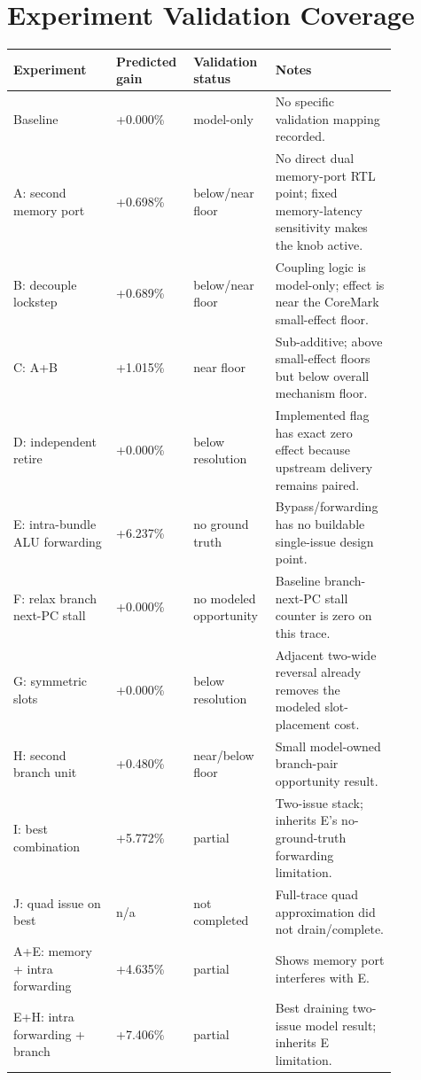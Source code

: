 \documentclass[10pt]{article}
\begin{document}
\section*{Experiment Validation Coverage}

\begin{longtable}{@{}p{0.25\linewidth}p{0.16\linewidth}p{0.19\linewidth}p{0.26\linewidth}@{}}
\toprule
Experiment & Predicted gain & Validation status & Notes \\
\midrule
\endhead
Baseline & +0.000\% & model-only & No specific validation mapping recorded. \\
A: second memory port & +0.698\% & below/near floor & No direct dual memory-port RTL point; fixed memory-latency sensitivity makes the knob active. \\
B: decouple lockstep & +0.689\% & below/near floor & Coupling logic is model-only; effect is near the CoreMark small-effect floor. \\
C: A+B & +1.015\% & near floor & Sub-additive; above small-effect floors but below overall mechanism floor. \\
D: independent retire & +0.000\% & below resolution & Implemented flag has exact zero effect because upstream delivery remains paired. \\
E: intra-bundle ALU forwarding & +6.237\% & no ground truth & Bypass/forwarding has no buildable single-issue design point. \\
F: relax branch next-PC stall & +0.000\% & no modeled opportunity & Baseline branch-next-PC stall counter is zero on this trace. \\
G: symmetric slots & +0.000\% & below resolution & Adjacent two-wide reversal already removes the modeled slot-placement cost. \\
H: second branch unit & +0.480\% & near/below floor & Small model-owned branch-pair opportunity result. \\
I: best combination & +5.772\% & partial & Two-issue stack; inherits E's no-ground-truth forwarding limitation. \\
J: quad issue on best & n/a & not completed & Full-trace quad approximation did not drain/complete. \\
A+E: memory + intra forwarding & +4.635\% & partial & Shows memory port interferes with E. \\
E+H: intra forwarding + branch & +7.406\% & partial & Best draining two-issue model result; inherits E limitation. \\
\bottomrule
\end{longtable}
\end{document}
